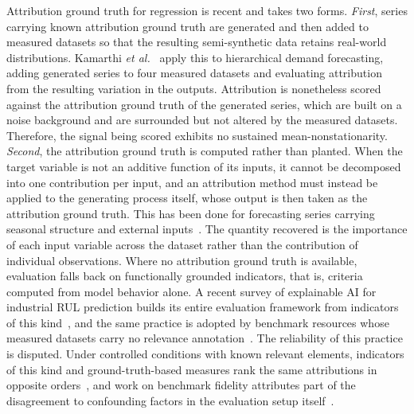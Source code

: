 \documentclass{article}
\begin{document}
Attribution ground truth for regression is recent and takes two forms. \textit{First}, series carrying known attribution ground truth are generated and then added to measured datasets so that the resulting semi-synthetic data retains real-world distributions. Kamarthi \emph{et al.}~\cite{kamarthi2026} apply this to hierarchical demand forecasting, adding generated series to four measured datasets and evaluating attribution from the resulting variation in the outputs. Attribution is nonetheless scored against the attribution ground truth of the generated series, which are built on a noise background and are surrounded but not altered by the measured datasets. Therefore, the signal being scored exhibits no sustained mean-nonstationarity. \textit{Second}, the attribution ground truth is computed rather than planted. When the target variable is not an additive function of its inputs, it cannot be decomposed into one contribution per input, and an attribution method must instead be applied to the generating process itself, whose output is then taken as the attribution ground truth. This has been done for forecasting series carrying seasonal structure and external inputs~\cite{shapformer2025}. The quantity recovered is the importance of each input variable across the dataset rather than the contribution of individual observations.
Where no attribution ground truth is available, evaluation falls back on functionally grounded indicators, that is, criteria computed from model behavior alone. A recent survey of explainable AI for industrial RUL prediction builds its entire evaluation framework from indicators of this kind~\cite{xairul2026}, and the same practice is adopted by benchmark resources whose measured datasets carry no relevance annotation~\cite{explaints2026}. The reliability of this practice is disputed. Under controlled conditions with known relevant elements, indicators of this kind and ground-truth-based measures rank the same attributions in opposite orders~\cite{baer2026}, and work on benchmark fidelity attributes part of the disagreement to confounding factors in the evaluation setup itself~\cite{backdoorxai2024}.
\end{document}
